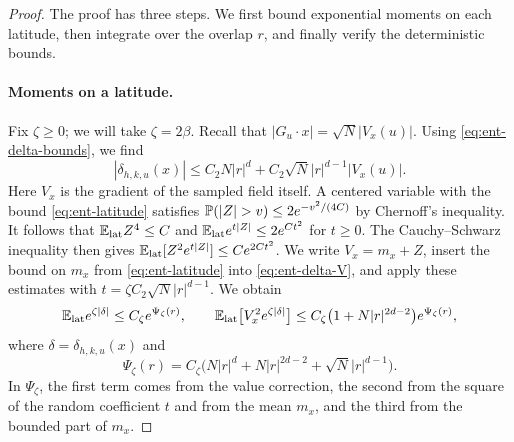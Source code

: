 \begin{proof}
The proof has three steps. We first bound exponential moments on each
latitude, then integrate over the overlap $r$, and finally verify the
deterministic bounds.

\paragraph{Moments on a latitude.}
Fix $\zeta\ge0$; we will take $\zeta=2\beta$. Recall that $|G_u\cdot x|=\sqrt N|V_x(u)|$.
Using \eqref{eq:ent-delta-bounds}, we find
\begin{equation}\label{eq:ent-delta-V}
 |\delta_{h,k,u}(x)|\le C_2N|r|^d+C_2\sqrt N|r|^{d-1}|V_x(u)|.
\end{equation}
Here $V_x$ is the gradient of the sampled field itself. A centered variable
with the bound \eqref{eq:ent-latitude} satisfies
$\Pp(|Z|>v)\le2e^{-v^2/(4C)}$ by Chernoff's inequality. It follows that
$\mathbb E_{\rm lat}Z^4\le C$ and
$\mathbb E_{\rm lat}e^{t|Z|}\le2e^{Ct^2}$ for $t\ge0$. The Cauchy--Schwarz
inequality then gives $\mathbb E_{\rm lat}[Z^2e^{t|Z|}]\le Ce^{2Ct^2}$. We write
$V_x=m_x+Z$, insert the bound on $m_x$ from \eqref{eq:ent-latitude} into
\eqref{eq:ent-delta-V}, and apply these estimates with
$t=\zeta C_2\sqrt N|r|^{d-1}$. We obtain
\begin{equation}\label{eq:ent-lat-moments}
 \mathbb E_{\rm lat}e^{\zeta|\delta|}\le C_\zeta e^{\Psi_\zeta(r)},\qquad
 \mathbb E_{\rm lat}\bigl[V_x^2e^{\zeta|\delta|}\bigr]
 \le C_\zeta\bigl(1+N|r|^{2d-2}\bigr)e^{\Psi_\zeta(r)},
\end{equation}
where $\delta=\delta_{h,k,u}(x)$ and
\[
 \Psi_\zeta(r)=C_\zeta\bigl(N|r|^d+N|r|^{2d-2}+\sqrt N|r|^{d-1}\bigr).
\]
In $\Psi_\zeta$, the first term comes from the value correction, the second
from the square of the random coefficient $t$ and from the mean $m_x$, and
the third from the bounded part of $m_x$.


\end{proof}
